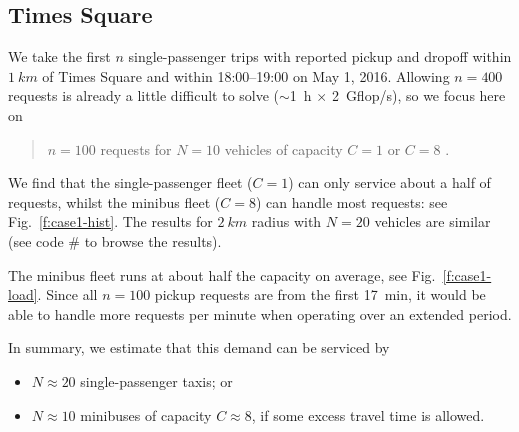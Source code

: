 \documentclass[12pt,notitlepage]{article}
\begin{document}
\subsection[Times Square]{Times Square}
\label{s:case1}

\edef\caseone{\thecodeindex}

We take
the first $n$ single-passenger trips 
with
reported pickup and dropoff 
within
$\SI{1}{km}$ of Times Square
and
within 
18:00--19:00 on May 1, 2016.
%
%	
Allowing $n = 400$ requests
is already a little difficult to solve ($\sim$\SI{1}{h} $\times$ \SI{2}{Gflop/s}),
so we focus here on
\begin{quote}
	$n = 100$ requests
	for
	$N = 10$ vehicles of capacity $C = 1$ or $C = 8$
	.
\end{quote}

%

We find that the single-passenger fleet ($C = 1$)
can only service about a half of requests,
whilst
the minibus fleet ($C = 8$) can handle most requests:
see Fig.~\ref{f:case1-hist}.
%
%
The results for $\SI{2}{km}$ radius with $N = 20$ 
vehicles are similar (see code \#\caseone\xspace to browse the results).

%

The minibus fleet runs at about half the capacity on average, see Fig.~\ref{f:case1-load}.
%
Since all $n = 100$ pickup requests are from the first \SI{17}{min},
it would be able to handle more requests per minute
when operating over an extended period.

%

In summary,
we estimate that this demand can be serviced by 
\begin{itemize}
\item 
	$N \approx 20$ single-passenger taxis; or
\item
	$N \approx 10$ minibuses of capacity $C \approx 8$,
	if some excess travel time is allowed.
\end{itemize}

%


\end{document}
